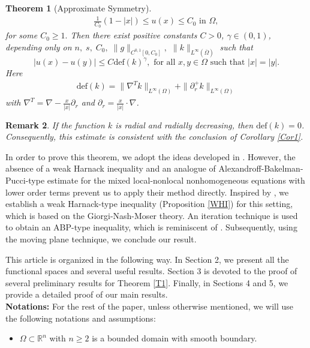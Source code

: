 \documentclass[11pt, notitlepage]{article}
\newtheorem{Theorem}{Theorem}[section]
\newtheorem{Remark}[Theorem]{Remark}
\begin{document}
{\begin{Theorem}[Approximate Symmetry]
    \begin{align}\label{lowerbound}
        \frac{1}{C_0}(1-|x|)\leq u(x)\leq C_0 \text{ in } \Omega,
    \end{align}
    for some $C_0\geq 1.$ Then there exist positive constants $C>0$, $\gamma\in(0,1)$, depending only on $n,\; s,\; C_0,\; \|g\|_{C^{0,1}[0,C_0]},$ $\|k\|_{L^\infty(\overline{\Omega})}$ such that  $$|u(x)-u(y)|\leq C \mathrm{def}(k)^\gamma,\text{ for all }x,y\in \Omega \text{ such that } |x|=|y|.$$
Here 
    \begin{align}\label{def}
        \mathrm{def}(k)=\|\nabla^Tk\|_{L^\infty(\Omega)}+\|\partial^+_rk\|_{L^\infty(\Omega)}
    \end{align}
    with $\nabla^T=\nabla-\frac{x}{|x|}\partial_r$ and $\partial_r=\frac{x}{|x|}\cdot\nabla$.
\end{Theorem}
\begin{Remark}
    If the function $k$ is radial and radially decreasing, then $\mathrm{def}(k)=0$. Consequently, this estimate is consistent with the conclusion of Corollary \ref{Cor1}. 
\end{Remark}
In order to prove this theorem, we adopt the ideas developed in \cite{Cozzi25, Cozzi24, Gatti}. However, the absence of a weak Harnack inequality and an analogue of Alexandroff-Bakelman-Pucci-type estimate for the mixed local-nonlocal nonhomogeneous equations with lower order terms prevent us to apply their method directly. Inspired by \cite{BV24, Garain25, GJ}, we establish a weak Harnack-type inequality (Proposition \ref{WHI}) for this setting, which is based on the Giorgi-Nash-Moser theory. An iteration technique is used to obtain an ABP-type inequality, which is reminiscent of \cite{Gatti}. Subsequently, using the moving plane technique, we conclude our result.

This article is organized in the following way. In Section 2, we present all the functional spaces and several useful results. Section 3 is devoted to the proof of several preliminary results for Theorem \ref{T1}. Finally, in Sections 4 and 5, we provide a detailed proof of our main results. \\
\textbf{Notations:} For the rest of the paper, unless otherwise mentioned, we will use the following notations and assumptions:
\begin{itemize}

    \item $\Omega\subset\mathbb{R}^n$ with $n\geq2$ is a bounded domain with smooth boundary.


\end{itemize}}
\end{document}

